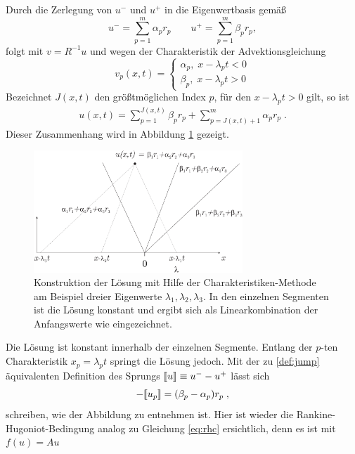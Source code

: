 Durch die Zerlegung von $u^-$ und $u^+$ in die Eigenwertbasis gemäß
\begin{equation*}
  u^- = \sum_{p=1}^m \alpha_p r_p \qquad u^+ = \sum_{p=1}^m \beta_p r_p,
\end{equation*}
folgt mit $v = R^{-1}u$ und wegen der Charakteristik der Advektionsgleichung
\begin{equation*}
  v_p(x,t) = \begin{cases} \alpha_p , \; x - \lambda_p t < 0 \\
                           \beta_p  , \; x - \lambda_p t > 0
             \end{cases}
\end{equation*}
Bezeichnet $J(x,t)$ den größtmöglichen Index $p$, für den $x-\lambda_p t > 0$ gilt, so ist
\begin{align}
  u(x,t) = \sum_{p=1}^{J(x,t)} \beta_p r_p + \sum_{p={J(x,t)}+1}^m \alpha_p r_p \; .
\end{align}
Dieser Zusammenhang wird in Abbildung \ref{fig:torte} gezeigt.
\begin{figure}
  \centering
  \includegraphics[width=0.7\textwidth]{files/Torte.pdf}
  \caption{Konstruktion der Lösung mit Hilfe der Charakteristiken-Methode am Beispiel dreier Eigenwerte $\lambda_1,\lambda_2,\lambda_3$. In den einzelnen Segmenten ist die Lösung konstant und ergibt sich als Linearkombination der Anfangswerte wie eingezeichnet.}
  \label{fig:torte}
\end{figure}
Die Lösung ist konstant innerhalb der einzelnen Segmente. Entlang der $p$-ten Charakteristik $x_p=\lambda_p t$ springt die Lösung jedoch. Mit der zu \ref{def:jump} äquivalenten Definition des Sprungs ${\llbracket u \rrbracket\equiv u^- - u^+}$ lässt sich
\begin{equation}
  -\llbracket u_p \rrbracket = (\beta_p - \alpha_p) r_p \; ,
  \label{eq:TortenJump}
\end{equation}
schreiben, wie der Abbildung zu entnehmen ist. Hier ist wieder die Rankine-Hugoniot-Bedingung analog zu Gleichung \eqref{eq:rhc} ersichtlich, denn es ist mit $f(u) = A u$
